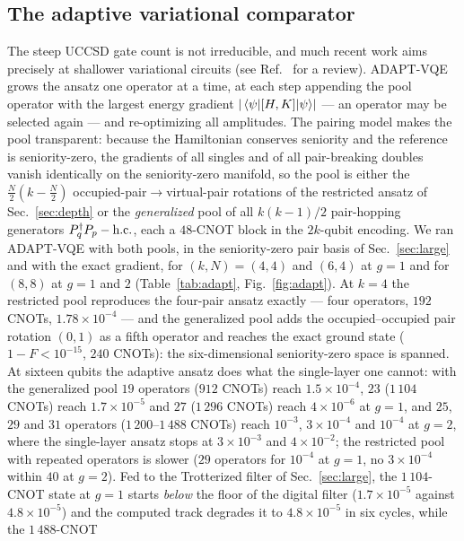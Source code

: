 \documentclass[
  aps,            %
  prc,            %
  reprint,        %
  superscriptaddress,
  floatfix,
  nofootinbib
]{revtex4-2}
\begin{document}
\subsection{The adaptive variational comparator}
\label{sec:adapt}
The steep UCCSD gate count is not irreducible, and much recent work aims
precisely at shallower variational circuits (see Ref.~\cite{Tilly2022} for a
review).  ADAPT-VQE~\cite{Grimsley2019} grows the ansatz one operator at a
time, at each step appending the pool operator with the largest energy
gradient $\abs{\expval{[H,K]}{\psi}}$ --- an operator may be selected again
--- and re-optimizing all amplitudes.  The pairing model makes the pool
transparent: because the Hamiltonian conserves seniority and the reference
is seniority-zero, the gradients of all singles and of all pair-breaking
doubles vanish identically on the seniority-zero manifold, so the pool is
either the $\frac N2(k-\frac N2)$ occupied-pair$\to$virtual-pair rotations
of the restricted ansatz of Sec.~\ref{sec:depth} or the \emph{generalized}
pool of all $k(k-1)/2$ pair-hopping generators $P_q^\dagger P_p-{\rm h.c.}$,
each a $48$-CNOT block in the $2k$-qubit encoding.  We ran ADAPT-VQE with
both pools, in the seniority-zero pair basis of Sec.~\ref{sec:large} and
with the exact gradient, for $(k,N)=(4,4)$ and $(6,4)$ at $g=1$ and for
$(8,8)$ at $g=1$ and $2$ (Table~\ref{tab:adapt}, Fig.~\ref{fig:adapt}).
At $k=4$ the restricted pool reproduces the four-pair ansatz exactly ---
four operators, $192$ CNOTs, $1.78\times10^{-4}$ --- and the generalized
pool adds the occupied--occupied pair rotation $(0,1)$ as a fifth operator
and reaches the exact ground state ($1-F<10^{-15}$, $240$ CNOTs): the
six-dimensional seniority-zero space is spanned.  At sixteen qubits the
adaptive ansatz does what the single-layer one cannot: with the
generalized pool $19$ operators ($912$ CNOTs) reach $1.5\times10^{-4}$,
$23$ ($1\,104$ CNOTs) reach $1.7\times10^{-5}$ and $27$ ($1\,296$ CNOTs)
reach $4\times10^{-6}$ at $g=1$, and $25$, $29$ and $31$ operators
($1\,200$--$1\,488$ CNOTs) reach $10^{-3}$, $3\times10^{-4}$ and $10^{-4}$
at $g=2$, where the single-layer ansatz stops at $3\times10^{-3}$ and
$4\times10^{-2}$; the restricted pool with repeated operators is slower
($29$ operators for $10^{-4}$ at $g=1$, no $3\times10^{-4}$ within $40$ at
$g=2$).  Fed to the Trotterized filter of Sec.~\ref{sec:large}, the
$1\,104$-CNOT state at $g=1$ starts \emph{below} the floor of the digital
filter ($1.7\times10^{-5}$ against $4.8\times10^{-5}$) and the computed track
degrades it to $4.8\times10^{-5}$ in six cycles, while the $1\,488$-CNOT
\end{document}
